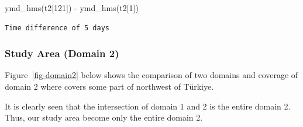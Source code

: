 \documentclass[
  letterpaper,
  DIV=11,
  numbers=noendperiod,
  abstract]{scrartcl}
\newenvironment{Shaded}{\begin{snugshade}}{\end{snugshade}}
\newcommand{\DecValTok}[1]{\textcolor[rgb]{0.68,0.00,0.00}{#1}}
\newcommand{\FunctionTok}[1]{\textcolor[rgb]{0.28,0.35,0.67}{#1}}
\newcommand{\NormalTok}[1]{\textcolor[rgb]{0.00,0.23,0.31}{#1}}
\newcommand{\SpecialCharTok}[1]{\textcolor[rgb]{0.37,0.37,0.37}{#1}}
\begin{document}
\begin{Shaded}
\begin{Highlighting}[]
\FunctionTok{ymd\_hms}\NormalTok{(t2[}\DecValTok{121}\NormalTok{]) }\SpecialCharTok{{-}} \FunctionTok{ymd\_hms}\NormalTok{(t2[}\DecValTok{1}\NormalTok{])}
\end{Highlighting}
\end{Shaded}

\begin{verbatim}
Time difference of 5 days
\end{verbatim}

\hypertarget{study-area-domain-2}{%
\subsubsection{Study Area (Domain 2)}\label{study-area-domain-2}}

Figure~\ref{fig-domain2} below shows the comparison of two domains and
coverage of domain 2 where covers some part of northwest of Türkiye.

It is clearly seen that the intersection of domain 1 and 2 is the entire
domain 2. Thus, our study area become only the entire domain 2.
\end{document}
